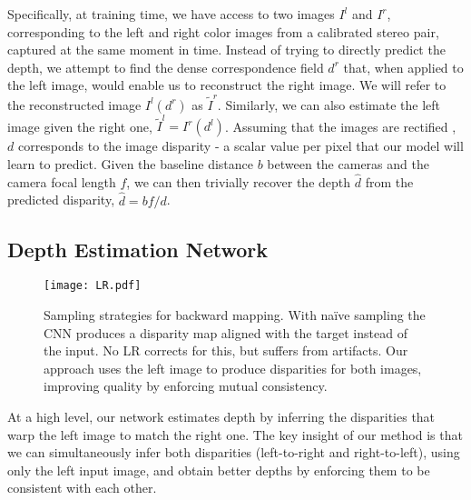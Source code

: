 \documentclass[10pt,twocolumn,letterpaper]{article}
\begin{document}
Specifically, at training time, we have access to two images $I^l$ and $I^r$, corresponding to the left and right color images from a calibrated stereo pair, captured at the same moment in time. 
Instead of trying to directly predict the depth, we attempt to find the dense correspondence field $d^r$ that, when applied to the left image, would enable us to reconstruct the right image. 
We will refer to the reconstructed image $I^l(d^r)$ as $\tilde{I}^r$. 
Similarly, we can also estimate the left image given the right one, $\tilde{I}^l = I^r(d^l)$.
Assuming that the images are rectified \cite{hartley2003multiple}, $d$ corresponds to the image disparity - a scalar value per pixel that our model will learn to predict.   
Given the baseline distance $b$ between the cameras and the camera focal length $f$,  we can then trivially recover the depth $\hat{d}$ from the predicted disparity, $\hat{d} = bf/d$. 


\subsection{Depth Estimation Network}

\begin{figure}[!t]
  \centering
  \texttt{[image: LR.pdf]}
  \caption{Sampling strategies for backward mapping. With na\"{i}ve sampling the CNN produces a disparity map aligned with the target instead of the input. No LR corrects for this, but suffers from artifacts. Our approach uses the left image to produce disparities for both images, improving quality by enforcing mutual consistency.}
  \label{fig:LR}
\end{figure}

At a high level, our network estimates depth by inferring the disparities that warp the left image to match the right one. 
The key insight of our method is that we can simultaneously infer both disparities (left-to-right and right-to-left), using only the left input image, and obtain better depths by enforcing them to be consistent with each other.
\end{document}
